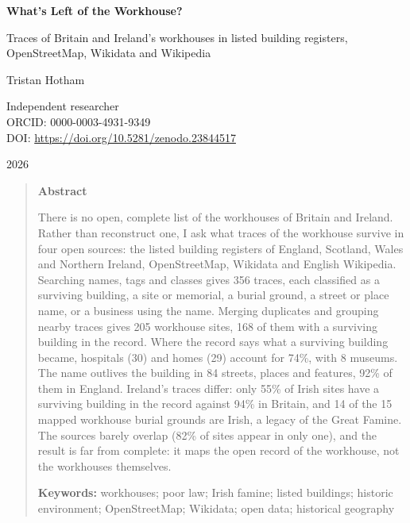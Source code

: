 \documentclass[11pt,a4paper]{article}
\begin{document}
\begin{center}
{\Large\bfseries What's Left of the Workhouse?\par}
\vspace{0.4em}
{\large Traces of Britain and Ireland's workhouses in listed building registers,\\OpenStreetMap, Wikidata and Wikipedia\par}
\vspace{1.2em}
{\large Tristan Hotham\par}
\vspace{0.3em}
{\small Independent researcher\\
ORCID: 0000-0003-4931-9349\\
DOI: \href{https://doi.org/10.5281/zenodo.23844517}{https://doi.org/10.5281/zenodo.23844517}\par}
\vspace{0.8em}
2026
\end{center}

\begin{quote}
\small
\begin{center}\textbf{Abstract}\end{center}
There is no open, complete list of the workhouses of Britain and Ireland. Rather than reconstruct one, I ask what traces of the workhouse survive in four open sources: the listed building registers of England, Scotland, Wales and Northern Ireland, OpenStreetMap, Wikidata and English Wikipedia. Searching names, tags and classes gives 356 traces, each classified as a surviving building, a site or memorial, a burial ground, a street or place name, or a business using the name. Merging duplicates and grouping nearby traces gives 205 workhouse sites, 168 of them with a surviving building in the record. Where the record says what a surviving building became, hospitals (30) and homes (29) account for 74\%, with 8 museums. The name outlives the building in 84 streets, places and features, 92\% of them in England. Ireland's traces differ: only 55\% of Irish sites have a surviving building in the record against 94\% in Britain, and 14 of the 15 mapped workhouse burial grounds are Irish, a legacy of the Great Famine. The sources barely overlap (82\% of sites appear in only one), and the result is far from complete: it maps the open record of the workhouse, not the workhouses themselves.

\textbf{Keywords:} workhouses; poor law; Irish famine; listed buildings; historic environment; OpenStreetMap; Wikidata; open data; historical geography
\end{quote}
\end{document}
